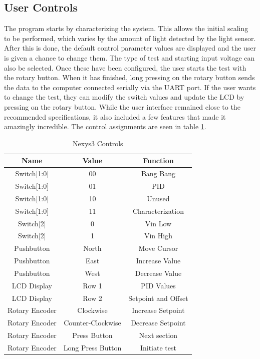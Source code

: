 \documentclass[11pt]{article}
\begin{document}
\subsection{User Controls} 
The program starts by characterizing the system.  This allows the initial scaling to be performed, which varies by the amount of light detected by the light sensor. After this is done, the default control parameter values are displayed and the user is given a chance to change them.  The type of test and starting input voltage can also be selected.  Once these have been configured, the user starts the test with the rotary button.  When it has finished, long pressing on the rotary button sends the data to the computer connected serially via the UART port.  If the user wants to change the test, they can modify the switch values and update the LCD by pressing on the rotary button.  While the user interface remained close to the recommended specifications, it also included a few features that made it amazingly incredible. The control assignments are seen in table \ref{controls}.
 
 
	\begin {table}[h!]
	\begin {center} 
	\vspace{15pt}
	
	\begin{tabular}{||c|c|c||}\hline	
		\textbf{Name}	&	\textbf{Value}	&	\textbf{Function}		\\\hline
		Switch[1:0]		&	00		&	Bang Bang 		\\\hline
		Switch[1:0]		&	01		&	PID 		\\\hline
		Switch[1:0]		&	10		&	Unused	 	\\\hline
		Switch[1:0]		&	11		&	Characterization 		\\\hline
		Switch[2]		&	0		&	Vin Low		\\\hline
		Switch[2]		&	1		&	Vin High	\\\hline
		Pushbutton		&	North	&	Move Cursor		\\\hline
		Pushbutton		&	East	&	Increase Value		\\\hline
		Pushbutton		&	West	&	Decrease Value		\\\hline
		LCD Display 	&	Row 1	&	PID Values	\\\hline
		LCD Display 	&	Row 2	&	Setpoint and Offset	\\\hline
		Rotary Encoder	& Clockwise	& 	Increase Setpoint		\\\hline
		Rotary Encoder	& Counter-Clockwise	& 	Decrease Setpoint		\\\hline
		Rotary Encoder	& Press Button		& 	Next section \\\hline
		Rotary Encoder	& Long Press Button	& 	Initiate test \\\hline
		
	\end{tabular}
		\caption {Nexys3 Controls} \label{controls}
	\end{center}
	\end{table} 		
  
\end{document}
